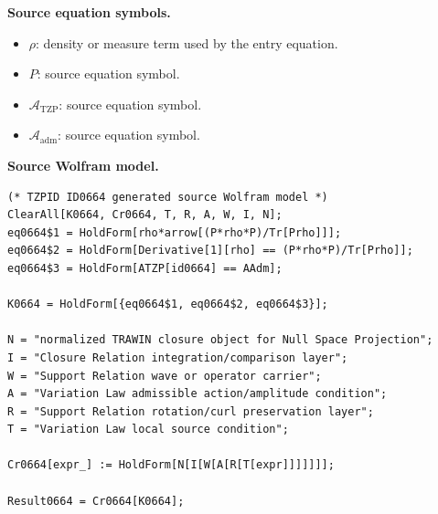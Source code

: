 \begin{minipage}[t]{0.49\linewidth}
\begingroup
\small
\raggedright
\textbf{Source equation symbols.}\par
\begin{itemize}[leftmargin=1.35em,itemsep=1pt,topsep=1pt,parsep=0pt]
    \item $\rho$: density or measure term used by the entry equation.
    \item $P$: source equation symbol.
    \item $\mathcal{A}_{\mathrm{TZP}}$: source equation symbol.
    \item $\mathcal{A}_{\mathrm{adm}}$: source equation symbol.
\end{itemize}
\endgroup
\end{minipage}\hfill
\begin{minipage}[t]{0.47\linewidth}
\begingroup
\scriptsize
\raggedright
\textbf{Source Wolfram model.}\par
\begin{Verbatim}[fontsize=\tiny,breaklines=true,breakanywhere=true]
(* TZPID ID0664 generated source Wolfram model *)
ClearAll[K0664, Cr0664, T, R, A, W, I, N];
eq0664$1 = HoldForm[rho*arrow[(P*rho*P)/Tr[Prho]]];
eq0664$2 = HoldForm[Derivative[1][rho] == (P*rho*P)/Tr[Prho]];
eq0664$3 = HoldForm[ATZP[id0664] == AAdm];

K0664 = HoldForm[{eq0664$1, eq0664$2, eq0664$3}];

N = "normalized TRAWIN closure object for Null Space Projection";
I = "Closure Relation integration/comparison layer";
W = "Support Relation wave or operator carrier";
A = "Variation Law admissible action/amplitude condition";
R = "Support Relation rotation/curl preservation layer";
T = "Variation Law local source condition";

Cr0664[expr_] := HoldForm[N[I[W[A[R[T[expr]]]]]]];

Result0664 = Cr0664[K0664];
\end{Verbatim}
\endgroup
\end{minipage}

